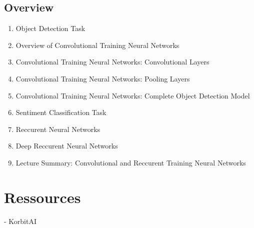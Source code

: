 \documentclass{article}
\begin{document}
\subsection{Overview}%
\label{sub:Overview}

\begin{enumerate}
    \item Object Detection Task
    \item Overview of Convolutional Training Neural Networks
    \item Convolutional Training Neural Networks: Convolutional Layers
    \item Convolutional Training Neural Networks: Pooling Layers
    \item Convolutional Training Neural Networks: Complete Object Detection Model
    \item Sentiment Classification Task
    \item Reccurent Neural Networks
    \item Deep Reccurent Neural Networks
    \item Lecture Summary: Convolutional and Reccurent Training Neural Networks
\end{enumerate}

\section{Ressources}%
\label{sec:Ressources}

- KorbitAI
\end{document}
